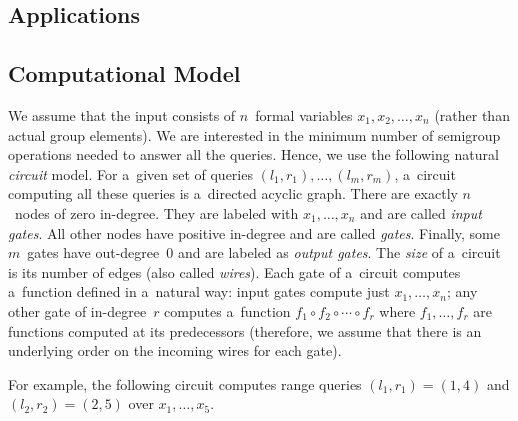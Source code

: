 \documentclass[11pt,letterpaper]{article}
\begin{document}

\subsection{Applications}


\subsection{Computational Model}
We assume that the input consists of $n$~formal variables $x_1, x_2, \dotsc, x_n$ (rather than actual group elements). We are interested in the minimum number of semigroup operations needed to answer all the queries. Hence, we use the following natural {\em circuit} model. For a~given set of queries $(l_1,r_1), \dotsc, (l_m,r_m)$, a~circuit computing all these queries is a~directed acyclic graph. There are exactly $n$~nodes of zero in-degree. They are labeled with $x_1, \dotsc, x_n$ and are called {\em input gates}. All other nodes have positive in-degree and are called {\em gates}. Finally, some $m$~gates have out-degree~0 and are labeled as {\em output gates}. The {\em size} of a~circuit is its number of edges (also called {\em wires}). Each gate of a~circuit computes a~function defined in a~natural way: input gates compute just $x_1, \dotsc, x_n$; any other gate of in-degree~$r$ computes a~function $f_1 \circ f_2 \circ \dotsb \circ f_r$ where $f_1, \dotsc, f_r$ are functions computed at its predecessors (therefore, we assume that there is an underlying order on the incoming wires for each gate).

For example, the following circuit computes range queries $(l_1,r_1)=(1,4)$ and $(l_2,r_2)=(2,5)$ over $x_1, \dotsc, x_5$.
\begin{center}
\end{center}
\end{document}
